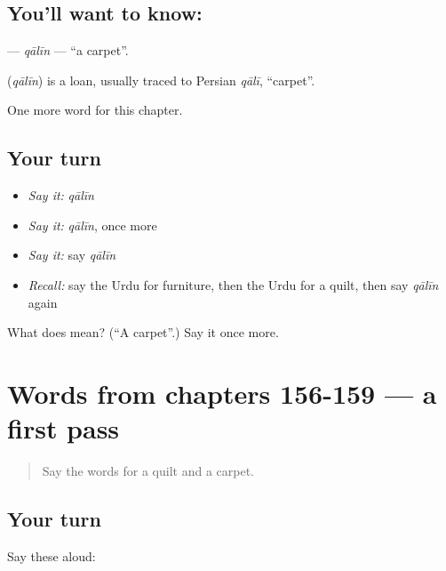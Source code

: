 \subsection*{You'll want to know: }
\textbf{} — \emph{qālīn} — \textquotedblleft{}a carpet\textquotedblright{}.

\begin{cousinweb}
\textbf{} (\emph{qālīn}) is a loan, usually traced to Persian \emph{qālī}, \textquotedblleft{}carpet\textquotedblright{}.
\end{cousinweb}

\begin{grammarlens}[title={What you've built}]
One more word for this chapter.
\end{grammarlens}

\subsection*{Your turn}
\begin{itemize}
\raggedright
  \item \emph{Say it:} \emph{qālīn}
  \item \emph{Say it:} \emph{qālīn}, once more
  \item \emph{Say it:} say \emph{qālīn}
  \item \emph{Recall:} say the Urdu for furniture, then the Urdu for a quilt, then say \emph{qālīn} again
\end{itemize}

\begin{tcolorbox}[breakable,colback=teal!4,colframe=teal!35!black,title={Before you move on}]
What does  mean? (\textquotedblleft{}A carpet\textquotedblright{}.) Say it once more.
\end{tcolorbox}
\section[(dialogue)]{Words from chapters 156-159 — a first pass}

\label{lesson:UR-R164-first-pass-words-from-chapters-156-159}



\begin{quote}
Say the words for a quilt and a carpet.
\end{quote}

\subsection*{Your turn}
Say these aloud:

